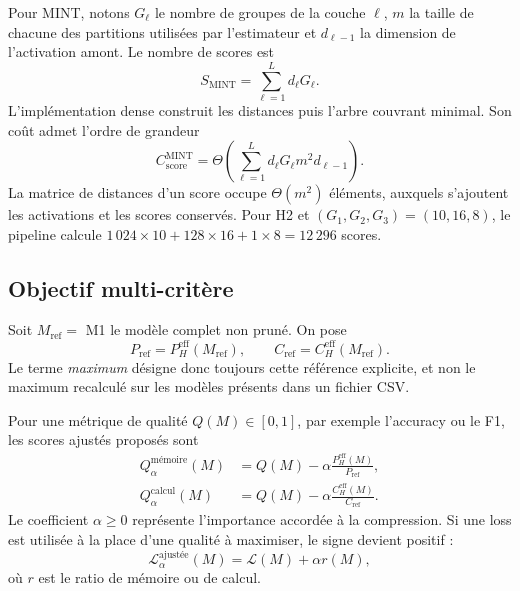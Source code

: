 Pour MINT, notons $G_{\ell}$ le nombre de groupes de la couche $\ell$, $m$ la
taille de chacune des partitions utilisées par l'estimateur et
$d_{\ell-1}$ la dimension de l'activation amont. Le nombre de scores est
\begin{equation}
    S_{\mathrm{MINT}}=\sum_{\ell=1}^{L}d_{\ell}G_{\ell}.
\end{equation}
L'implémentation dense construit les distances puis l'arbre couvrant minimal.
Son coût admet l'ordre de grandeur
\begin{equation}
    C_{\mathrm{score}}^{\mathrm{MINT}}
    =\Theta\!\left(
      \sum_{\ell=1}^{L}
      d_{\ell}G_{\ell}m^2d_{\ell-1}
    \right).
    \label{eq:complexite_mint}
\end{equation}
La matrice de distances d'un score occupe $\Theta(m^2)$ éléments, auxquels
s'ajoutent les activations et les scores conservés. Pour H2 et
$(G_1,G_2,G_3)=(10,16,8)$, le pipeline calcule
$1\,024\times10+128\times16+1\times8=12\,296$ scores.

\subsection{Objectif multi-critère}
\label{ssec:probleme_objectif}

Soit $M_{\mathrm{ref}}=$ M1 le modèle complet non pruné. On pose
\begin{equation}
    P_{\mathrm{ref}}=P_H^{\mathrm{eff}}(M_{\mathrm{ref}}),
    \qquad
    C_{\mathrm{ref}}=C_H^{\mathrm{eff}}(M_{\mathrm{ref}}).
\end{equation}
Le terme \emph{maximum} désigne donc toujours cette référence explicite,
et non le maximum recalculé sur les modèles présents dans un fichier CSV.

Pour une métrique de qualité $Q(M)\in[0,1]$, par exemple l'accuracy ou le F1,
les scores ajustés proposés sont
\begin{align}
    Q_{\alpha}^{\text{mémoire}}(M)
        &=Q(M)-\alpha
          \frac{P_H^{\mathrm{eff}}(M)}{P_{\mathrm{ref}}},
          \label{eq:qualite_ajustee_memoire}\\
    Q_{\alpha}^{\text{calcul}}(M)
        &=Q(M)-\alpha
          \frac{C_H^{\mathrm{eff}}(M)}{C_{\mathrm{ref}}}.
          \label{eq:qualite_ajustee_calcul}
\end{align}
Le coefficient $\alpha\geq0$ représente l'importance accordée à la
compression. Si une loss est utilisée à la place d'une qualité à maximiser, le
signe devient positif :
\begin{equation}
    \mathcal{L}_{\alpha}^{\text{ajustée}}(M)
    =\mathcal{L}(M)+\alpha r(M),
\end{equation}
où $r$ est le ratio de mémoire ou de calcul.

